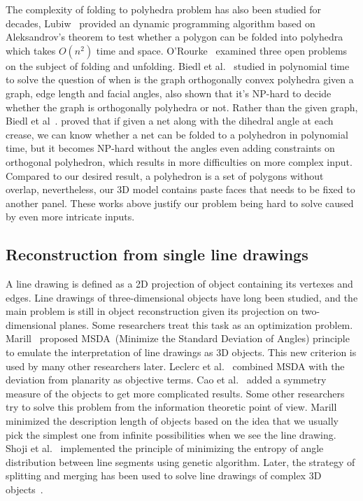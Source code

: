 The complexity of folding to polyhedra problem has also been studied for decades, Lubiw~\cite{Lubiw1996When} provided an dynamic programming algorithm based on Aleksandrov's theorem to test whether a polygon can be folded into polyhedra which takes $O(n^2)$ time and space. 
O'Rourke~\cite{O'Rourke:1998:FUC:646319.686376} examined three open problems on the subject of folding and unfolding. 
Biedl et al.~\cite{Biedl2004When} studied in polynomial time to solve the question of when is the graph orthogonally convex polyhedra given a graph, edge length and facial angles, also shown that it's NP-hard to decide whether the graph is orthogonally polyhedra or not. Rather than the given graph, Biedl et al~\cite{Biedl:2005:NFP:1090462.1646553}. proved that if given a net along with the dihedral angle at each crease, we can know whether a net can be folded to a polyhedron in polynomial time, but it becomes NP-hard without the angles even adding constraints on orthogonal polyhedron, which results in more difficulties on more complex input.
Compared to our desired result, a polyhedron is a set of polygons without overlap, nevertheless, our 3D model contains paste faces that needs to be fixed to another panel. 
These works above justify our problem being hard to solve caused by even more intricate inputs.

\subsection{Reconstruction from single line drawings} 
A line drawing is defined as a 2D projection of object containing its vertexes and edges. Line drawings of three-dimensional objects have long been studied, and the main problem is still in object reconstruction given its projection on two-dimensional planes. 
Some researchers treat this task as an optimization problem. 
Marill~\cite{Marill:1991:EHI:113057.113061} proposed MSDA~(Minimize the Standard Deviation of Angles) principle to emulate the interpretation of line drawings as 3D objects. 
This new criterion is used by many other researchers later. 
Leclerc et al.~\cite{Leclerc1992An} combined MSDA with the deviation from planarity as objective terms. 
Cao et al.~\cite{Cao:2005:ORS:1097114.1097658} added a symmetry measure of the objects to get more complicated results. 
Some other researchers try to solve this problem from the information theoretic point of view. 
Marill~\cite{Marill1992Why} minimized the description length of objects based on the idea that we usually pick the simplest one from infinite possibilities when we see the line drawing. 
Shoji et al.~\cite{Shoji20013} implemented the principle of minimizing the entropy of angle distribution between line segments using genetic algorithm. Later, the strategy of splitting and merging has been used to solve line drawings of complex 3D objects~\cite{10.1109/TPAMI.2010.49,10.1109/CVPR.2014.94}.   
		 
